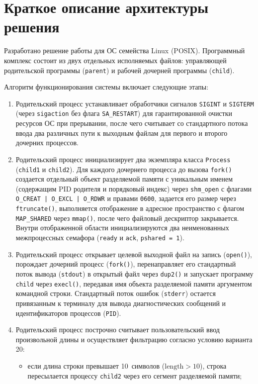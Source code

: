 \documentclass[11pt, a4paper]{article}
\begin{document}
\section{Краткое описание архитектуры решения}
Разработано решение работы для ОС семейства Linux (POSIX). Программный комплекс состоит из двух отдельных исполняемых файлов: управляющей родительской программы (\texttt{parent}) и рабочей дочерней программы (\texttt{child}).

Алгоритм функционирования системы включает следующие этапы:
\begin{enumerate}
    \item Родительский процесс устанавливает обработчики сигналов \texttt{SIGINT} и \texttt{SIGTERM} (через \texttt{sigaction} без флага \texttt{SA\_RESTART}) для гарантированной очистки ресурсов ОС при прерывании, после чего считывает со стандартного потока ввода два различных пути к выходным файлам для первого и второго дочерних процессов.
    \item Родительский процесс инициализирует два экземпляра класса \texttt{Process} (\texttt{child1} и \texttt{child2}). Для каждого дочернего процесса до вызова \texttt{fork()} создается отдельный объект разделяемой памяти с уникальным именем (содержащим PID родителя и порядковый индекс) через \texttt{shm\_open} с флагами \texttt{O\_CREAT | O\_EXCL | O\_RDWR} и правами \texttt{0600}, задается его размер через \texttt{ftruncate()}, выполняется отображение в адресное пространство с флагом \texttt{MAP\_SHARED} через \texttt{mmap()}, после чего файловый дескриптор закрывается. Внутри отображенной области инициализируются два неименованных межпроцессных семафора (\texttt{ready} и \texttt{ack}, \texttt{pshared = 1}).
    \item Родительский процесс открывает целевой выходной файл на запись (\texttt{open()}), порождает дочерний процесс (\texttt{fork()}), перенаправляет его стандартный поток вывода (\texttt{stdout}) в открытый файл через \texttt{dup2()} и запускает программу \texttt{child} через \texttt{execl()}, передавая имя объекта разделяемой памяти аргументом командной строки. Стандартный поток ошибок (\texttt{stderr}) остается привязанным к терминалу для вывода диагностических сообщений и идентификаторов процессов (\texttt{PID}).
    \item Родительский процесс построчно считывает пользовательский ввод произвольной длины и осуществляет фильтрацию согласно условию варианта 20:
    \begin{itemize}
        \item если длина строки превышает 10~символов ($\text{length} > 10$), строка пересылается процессу \texttt{child2} через его сегмент разделяемой памяти;

\end{itemize}
\end{enumerate}
\end{document}
